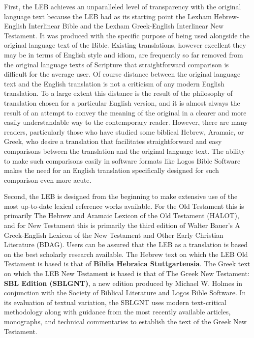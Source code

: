 First, the LEB achieves an unparalleled level of transparency with the original language text because the LEB had as 
its starting point the Lexham Hebrew-English Interlinear Bible and the Lexham Greek-English Interlinear New Testament. 
It was produced with the specific purpose of being used alongside the original language text of the Bible. Existing 
translations, however excellent they may be in terms of English style and idiom, are frequently so far removed from 
the original language texts of Scripture that straightforward comparison is difficult for the average user. Of course 
distance between the original language text and the English translation is not a criticism of any modern English 
translation. To a large extent this distance is the result of the philosophy of translation chosen for a particular 
English version, and it is almost always the result of an attempt to convey the meaning of the original in a clearer 
and more easily understandable way to the contemporary reader. However, there are many readers, particularly those 
who have studied some biblical Hebrew, Aramaic, or Greek, who desire a translation that facilitates straightforward 
and easy comparisons between the translation and the original language text. The ability to make such comparisons 
easily in software formats like Logos Bible Software makes the need for an English translation specifically designed 
for such comparison even more acute.\par

Second, the LEB is designed from the beginning to make extensive use of the most up-to-date lexical reference works 
available. For the Old Testament this is primarily The Hebrew and Aramaic Lexicon of the Old Testament (HALOT), and for 
New Testament this is primarily the third edition of Walter Bauer's A Greek-English Lexicon of the New Testament and 
Other Early Christian Literature (BDAG). Users can be assured that the LEB as a translation is based on the best scholarly 
research available. The Hebrew text on which the LEB Old Testament is based is that of \textbf{Biblia Hebraica Stuttgartensia}. 
The Greek text on which the LEB New Testament is based is that of The Greek New Testament: \textbf{SBL Edition (SBLGNT)}, a new 
edition produced by Michael W. Holmes in conjunction with the Society of Biblical Literature and Logos Bible Software. 
In its evaluation of textual variation, the SBLGNT uses modern text-critical methodology along with guidance from the 
most recently available articles, monographs, and technical commentaries to establish the text of the Greek New Testament.\par


